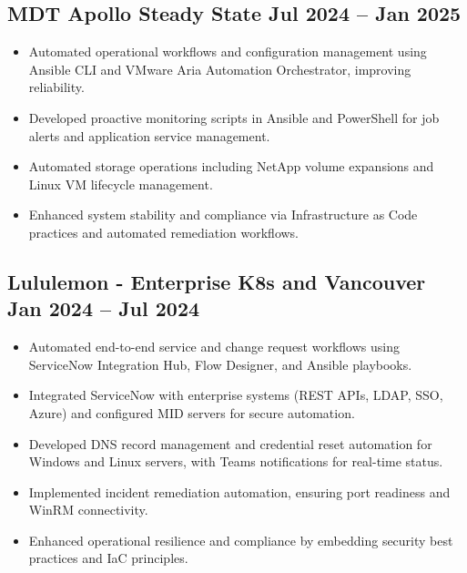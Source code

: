 \documentclass[a4paper,10pt]{article}
\begin{document}
\subsection*{MDT Apollo Steady State \hfill Jul 2024 -- Jan 2025}
\begin{itemize}
    \item Automated operational workflows and configuration management using Ansible CLI and VMware Aria Automation Orchestrator, improving reliability.
    \item Developed proactive monitoring scripts in Ansible and PowerShell for job alerts and application service management.
    \item Automated storage operations including NetApp volume expansions and Linux VM lifecycle management.
    \item Enhanced system stability and compliance via Infrastructure as Code practices and automated remediation workflows.
\end{itemize}

\subsection*{Lululemon - Enterprise K8s and Vancouver \hfill Jan 2024 -- Jul 2024}
\begin{itemize}
    \item Automated end-to-end service and change request workflows using ServiceNow Integration Hub, Flow Designer, and Ansible playbooks.
    \item Integrated ServiceNow with enterprise systems (REST APIs, LDAP, SSO, Azure) and configured MID servers for secure automation.
    \item Developed DNS record management and credential reset automation for Windows and Linux servers, with Teams notifications for real-time status.
    \item Implemented incident remediation automation, ensuring port readiness and WinRM connectivity.
    \item Enhanced operational resilience and compliance by embedding security best practices and IaC principles.
\end{itemize}
\end{document}
